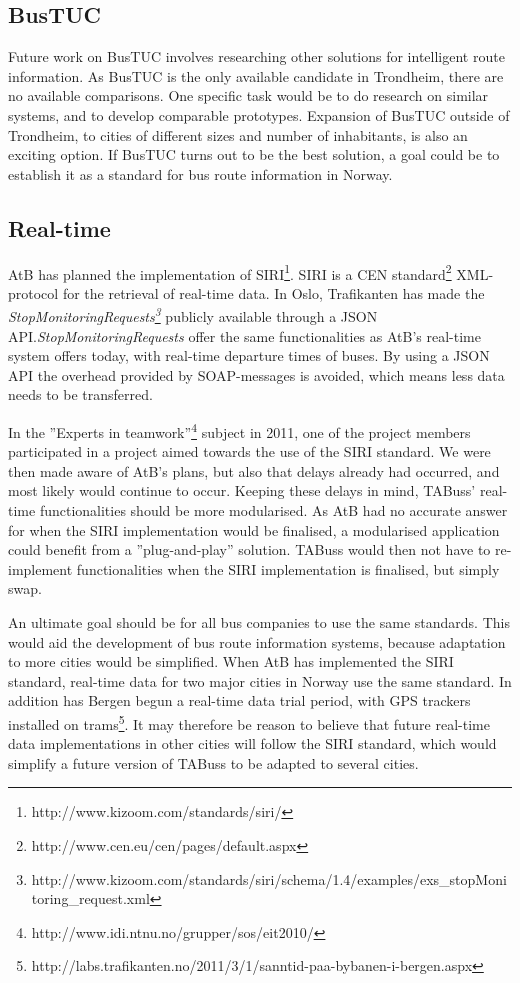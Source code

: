 \subsection{BusTUC}
Future work on BusTUC involves researching other solutions for intelligent route information. As BusTUC is the only available candidate in Trondheim, there are no available comparisons. One specific task would be to do research on similar systems, and to develop comparable prototypes. Expansion of BusTUC outside of Trondheim, to cities of different sizes and number of inhabitants, is also an exciting option. If BusTUC turns out to be the best solution, a goal could be to establish it as a standard for bus route information in Norway.

\subsection{Real-time}
AtB has planned the implementation of SIRI\footnote{http://www.kizoom.com/standards/siri/}. SIRI is a CEN standard\footnote{http://www.cen.eu/cen/pages/default.aspx} XML-protocol for the retrieval of real-time data. In Oslo, Trafikanten has made the \emph{StopMonitoringRequests\footnote{http://www.kizoom.com/standards/siri/schema/1.4/examples/exs\_stopMonitoring\_request.xml}} publicly available through a JSON API.\emph{StopMonitoringRequests} offer the same functionalities as AtB's real-time system offers today, with real-time departure times of buses. By using a JSON API the overhead provided by SOAP-messages is avoided, which means less data needs to be transferred.  

In the ''Experts in teamwork''\footnote{http://www.idi.ntnu.no/grupper/sos/eit2010/} subject in 2011, one of the project members participated in a project aimed towards the use of the SIRI standard. We were then made aware of AtB's plans, but also that delays already had occurred, and most likely would continue to occur. Keeping these delays in mind, TABuss' real-time functionalities should be more modularised. As AtB had no accurate answer for when the SIRI implementation would be finalised, a modularised application could benefit from a ''plug-and-play'' solution. TABuss would then not have to re-implement functionalities when the SIRI implementation is finalised, but simply swap.

An ultimate goal should be for all bus companies to use the same standards. This would aid the development of bus route information systems, because adaptation to more cities would be simplified. When AtB has implemented the SIRI standard, real-time data for two major cities in Norway use the same standard. In addition has Bergen begun a real-time data trial period, with GPS trackers installed on trams\footnote{http://labs.trafikanten.no/2011/3/1/sanntid-paa-bybanen-i-bergen.aspx}. It may therefore be reason to believe that future real-time data implementations in other cities will follow the SIRI standard, which would simplify a future version of TABuss to be adapted to several cities.





